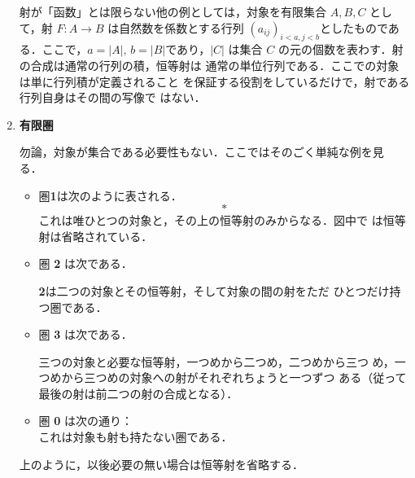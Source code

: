 \begin{enumerate}
       射が「函数」とは限らない他の例としては，対象を有限集合 $A, B, C$
       として，射 $F: A \to B$ は自然数を係数とする行列 $(a_{ij})_{i<a,
       j<b}$としたものである．ここで，$a = |A|,\, b = |B|$であり，$|C|$
       は集合 $C$ の元の個数を表わす．射の合成は通常の行列の積，恒等射は
       通常の単位行列である．ここでの対象は単に行列積が定義されること
       を保証する役割をしているだけで，射である行列自身はその間の写像で
       はない．
 \item {\bfseries 有限圏}

       勿論，対象が集合である必要性もない．ここではそのごく単純な例を見
       る．
       \begin{itemize}
	\item 圏{\bf 1}は次のように表される．
	      \[
	       \ast
	      \]
	      これは唯ひとつの対象と，その上の恒等射のみからなる．図中で
	      は恒等射は省略されている．
	\item 圏 {\bf 2} は次である．
	      \begin{center}
	      \end{center}
	      {\bf 2}は二つの対象とその恒等射，そして対象の間の射をただ
	      ひとつだけ持つ圏である．
	\item 圏 {\bf 3} は次である．
	      \begin{center}
	      \end{center}
	      三つの対象と必要な恒等射，一つめから二つめ，二つめから三つ
	      め，一つめから三つめの対象への射がそれぞれちょうと一つずつ
	      ある（従って最後の射は前二つの射の合成となる）．
	\item 圏 {\bf 0} は次の通り：\\

	      これは対象も射も持たない圏である．
       \end{itemize}
       上のように，以後必要の無い場合は恒等射を省略する．


\end{enumerate}
